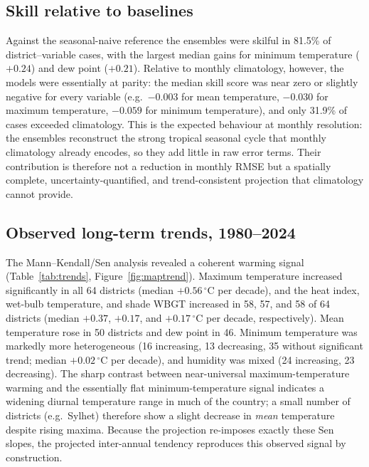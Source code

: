\documentclass[review,11pt]{elsarticle}
\newcommand{\degC}{\ensuremath{^{\circ}\mathrm{C}}}
\begin{document}
\begin{table}[htbp]
\centering
\caption{External validation of the projected 2025 fields against observed 2025,
summarised as the median across 64 districts. Errors are in each variable's
native unit ($\degC$ for temperatures and thermal indices; \% for humidity;
W\,m$^{-2}$ for solar radiation; index units for UV; $\degC$\,d\,d$^{-1}$ for
CDD).}
\label{tab:validation}

\end{table}

\subsection{Skill relative to baselines}\label{sec:res-skill}
Against the seasonal-naive reference the ensembles were skilful in 81.5\% of
district--variable cases, with the largest median gains for minimum temperature
($+0.24$) and dew point ($+0.21$). Relative to monthly climatology, however, the
models were essentially at parity: the median skill score was near zero or
slightly negative for every variable (e.g.\ $-0.003$ for mean temperature,
$-0.030$ for maximum temperature, $-0.059$ for minimum temperature), and only
31.9\% of cases exceeded climatology. This is the expected behaviour at monthly
resolution: the ensembles reconstruct the strong tropical seasonal cycle that
monthly climatology already encodes, so they add little in raw error terms. Their
contribution is therefore not a reduction in monthly RMSE but a spatially
complete, uncertainty-quantified, and trend-consistent projection that
climatology cannot provide.

\subsection{Observed long-term trends, 1980--2024}\label{sec:res-trend}
The Mann--Kendall/Sen analysis revealed a coherent warming signal
(Table~\ref{tab:trends}, Figure~\ref{fig:maptrend}). Maximum temperature
increased significantly in all 64 districts (median $+0.56\,\degC$ per decade),
and the heat index, wet-bulb temperature, and shade WBGT increased in 58, 57, and
58 of 64 districts (median $+0.37$, $+0.17$, and $+0.17\,\degC$ per decade,
respectively). Mean temperature rose in 50 districts and dew point in 46. Minimum
temperature was markedly more heterogeneous (16 increasing, 13 decreasing, 35
without significant trend; median $+0.02\,\degC$ per decade), and humidity was
mixed (24 increasing, 23 decreasing). The sharp contrast between near-universal
maximum-temperature warming and the essentially flat minimum-temperature signal
indicates a widening diurnal temperature range in much of the country; a small
number of districts (e.g.\ Sylhet) therefore show a slight decrease in \emph{mean}
temperature despite rising maxima. Because the projection re-imposes exactly these
Sen slopes, the projected inter-annual tendency reproduces this observed signal by
construction.
\end{document}
